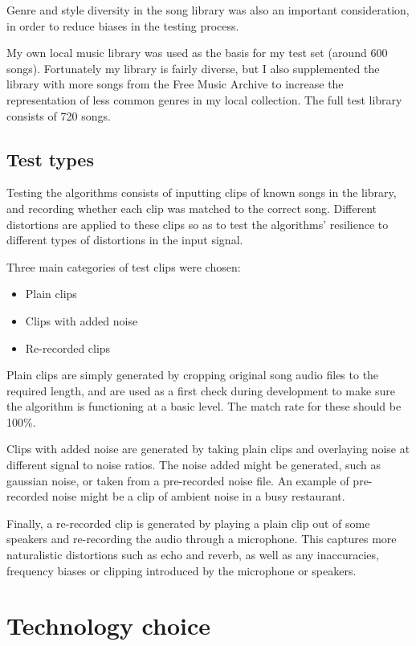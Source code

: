 \documentclass[12pt,a4paper,twoside,openright]{report}
\begin{document}
Genre and style diversity in the song library was also an important consideration, in order to reduce biases in the testing process.

My own local music library was used as the basis for my test set (around 600 songs). Fortunately my library is fairly diverse, but I also supplemented the library with more songs from the Free Music Archive to increase the representation of less common genres in my local collection. The full test library consists of 720 songs.

\subsection{Test types}

Testing the algorithms consists of inputting clips of known songs in the library, and recording whether each clip was matched to the correct song. Different distortions are applied to these clips so as to test the algorithms' resilience to different types of distortions in the input signal.

Three main categories of test clips were chosen:

\begin{itemize}
  \item Plain clips
  \item Clips with added noise
  \item Re-recorded clips
\end{itemize}

Plain clips are simply generated by cropping original song audio files to the required length, and are used as a first check during development to make sure the algorithm is functioning at a basic level. The match rate for these should be 100\%.

Clips with added noise are generated by taking plain clips and overlaying noise at different signal to noise ratios. The noise added might be generated, such as gaussian noise, or taken from a pre-recorded noise file. An example of pre-recorded noise might be a clip of ambient noise in a busy restaurant.

Finally, a re-recorded clip is generated by playing a plain clip out of some speakers and re-recording the audio through a microphone. This captures more naturalistic distortions such as echo and reverb, as well as any inaccuracies, frequency biases or clipping introduced by the microphone or speakers.


\section{Technology choice}
\end{document}
